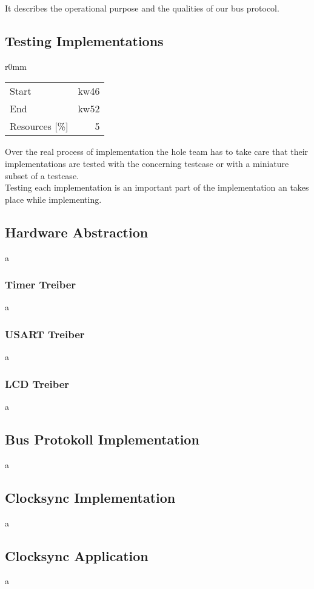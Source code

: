 It describes the operational purpose and the qualities of our bus protocol.
\subsection{Testing Implementations}
\begin{wrapfigure}{r}{0mm}
\begin{tabular}[t]{|lr|}
\hline
Start & kw46\\
End & kw52\\
Resources [\%] & 5\\
\hline
\end{tabular}
\end{wrapfigure}
Over the real process of implementation the hole team has to take care that their 
implementations are tested with the concerning testcase or with a miniature subset of a testcase.\\

Testing each implementation is an important part of the implementation an takes place while
implementing.
\subsection{Hardware Abstraction}
a
\subsubsection{Timer Treiber}
a
\subsubsection{USART Treiber}
a
\subsubsection{LCD Treiber}
a
\subsection{Bus Protokoll Implementation}
a
\subsection{Clocksync Implementation}
a
\subsection{Clocksync Application}
a


